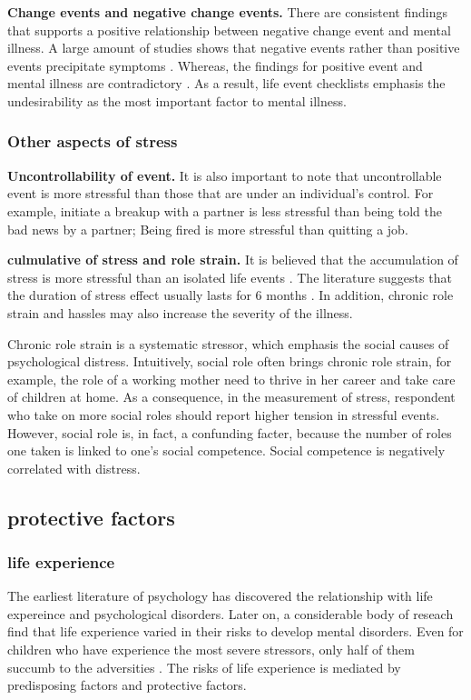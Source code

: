 \textbf{Change events and negative change events.} There are consistent findings that supports a positive relationship between negative change event and mental illness. A large amount of studies shows that negative events rather than positive events precipitate symptoms \cite{rabkin1976life,turner1995epidemiology}. Whereas, the findings for positive event and mental illness are contradictory \cite{zautra1983life}. As a result, life event checklists emphasis the undesirability as the most important factor to mental illness. 

\subsubsection{Other aspects of stress} 
\textbf{Uncontrollability of event.} It is also important to note that uncontrollable event is more stressful than those that are under an individual's control. For example, initiate a breakup with a partner is less stressful than being told the bad news by a partner; Being fired is more stressful than quitting a job. 


\textbf{culmulative of stress and role strain.} It is believed that the accumulation of stress is more stressful than an isolated life events \cite{evans2013childhood}. The literature suggests that the duration of stress effect usually lasts for 6 months  \cite{depue1986conceptualization,norris1987transitory}. In addition, chronic role strain and hassles may also increase the severity of the illness. 
 
Chronic role strain is a systematic stressor, which emphasis the social causes of psychological distress. Intuitively, social role often brings chronic role strain, for example, the role of a working mother need to thrive in her career and take care of children at home. As a consequence, in the measurement of stress, respondent who take on more social roles should report higher tension in stressful events. However, social role is, in fact, a confunding facter, because the number of roles one taken is linked to one's social competence. Social competence is negatively correlated with distress. 


\subsection{protective factors}
\subsubsection{life experience}
The earliest literature of psychology has discovered the relationship with life expereince and psychological disorders. Later on, a considerable body of reseach find that life experience varied in their risks to develop mental disorders. Even for children who have experience the most severe  stressors, only half of them succumb to the adversities \cite{rutter1979protective}. The risks of life experience is mediated by predisposing factors and protective factors. 

